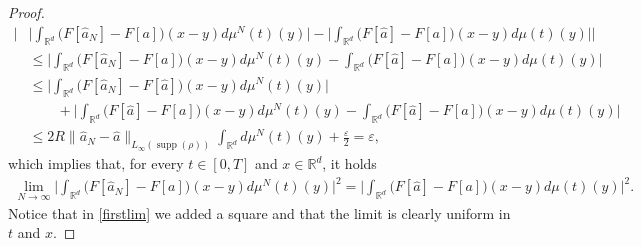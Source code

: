 \documentclass[A4paper,11pt]{article}
\theoremstyle{definition}
\newcommand{\R}{\mathbb{R}}
\DeclareMathOperator{\supp}{supp}
\begin{document}
\begin{proof}
	\begin{align*}
		\Biggl|
			&\biggl|\int_{\R^d}\bigl(F[\widehat a_{N}]-F[a]\bigr)(x-y)d\mu^{N}(t)(y)\biggr|
				-\biggl|\int_{\R^d}\bigl(F[\widehat a]-F[a]\bigr)(x-y)d\mu(t)(y)\biggr|\Biggr|\\
			&\leq\biggl|\int_{\R^d}\bigl(F[\widehat a_{N}]-F[a]\bigr)(x-y)d\mu^{N}(t)(y)
					-\int_{\R^d}\bigl(F[\widehat a]-F[a]\bigr)(x-y)d\mu(t)(y)\biggr|\\
			&\leq\Biggl|\int_{\R^d}
				\bigl(F[\widehat a_{N}]-F[\widehat a]\bigr)(x-y)d\mu^{N}(t)(y)\Biggr|\\
			&\qquad +\biggl|\int_{\R^d}\bigl(F[\widehat a]-F[a]\bigr)(x-y)d\mu^{N}(t)(y)
					-\int_{\R^d}\bigl(F[\widehat a]-F[a]\bigr)(x-y)d\mu(t)(y)\biggr|\\
			&\leq2R \|\widehat a_{N}-\widehat  a\|_{L_\infty(\supp(\rho))}\int_{\R^d}d\mu^{N}(t)(y)+\frac{\varepsilon}{2}=\varepsilon,
	\end{align*}
	which implies that, for every $t \in [0,T]$ and $x \in \R^d$, it holds
	\begin{align}\label{firstlim}
		\lim_{N\rightarrow\infty}\Biggl|\int_{\R^d}\bigl(F[\widehat a_{N}]-F[a]\bigr)(x-y)d\mu^{N}(t)(y)\Biggr|^2
			=\Biggl|\int_{\R^d}\bigl(F[\widehat a]-F[a]\bigr)(x-y)d\mu(t)(y)\Biggr|^2.
	\end{align}
	Notice that in \eqref{firstlim} we added a square and that the limit is clearly uniform in $t$ and $x$.
	

\end{proof}
\end{document}
